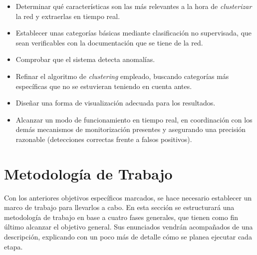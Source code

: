 \begin{itemize}

\item Determinar qué características son las más relevantes a la hora de \emph{clusterizar} la red y extraerlas en tiempo real.

\item Establecer unas categorías básicas mediante clasificación no supervisada, que sean verificables con la documentación que se tiene de la red.

\item Comprobar que el sistema detecta anomalías.

\item Refinar el algoritmo de \emph{clustering} empleado, buscando categorías más específicas que no se estuvieran teniendo en cuenta antes.

\item Diseñar una forma de visualización adecuada para los resultados.

\item Alcanzar un modo de funcionamiento en tiempo real, en coordinación con los demás mecanismos de monitorización presentes y asegurando una precisión razonable (detecciones correctas frente a falsos positivos).

\end{itemize}

\section{Metodología de Trabajo}\label{sec:metodologiatrabajo}

Con los anteriores objetivos específicos marcados, se hace necesario establecer un marco de trabajo para llevarlos a cabo.
En esta sección se estructurará una metodología de trabajo en base a cuatro fases generales, que tienen como fin último alcanzar el objetivo general.
Sus enunciados vendrán acompañados de una descripción, explicando con un poco más de detalle cómo se planea ejecutar cada etapa.


